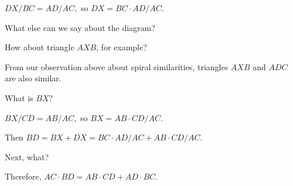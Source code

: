 $DX/BC = AD/AC,$ so $DX = BC \cdot  AD/AC.$

What else can we say about the diagram?

How about triangle $AXB$, for example?






From our observation above about spiral similarities, triangles $AXB$ and $ADC$ are also similar.

What is $BX?$



$BX/CD = AB/AC,$ so $BX = AB \cdot CD/AC.$

Then $BD = BX + DX = BC \cdot AD/AC + AB \cdot CD/AC.$

Next, what?






Therefore, $AC \cdot BD = AB \cdot CD + AD \cdot BC.$

